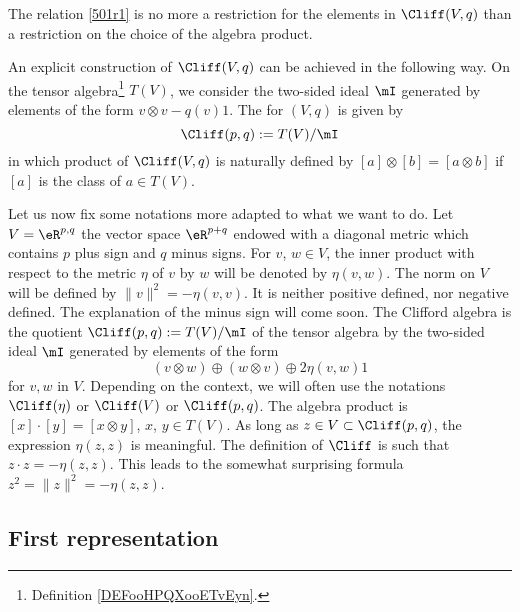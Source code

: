 \begin{remark}
	The relation \eqref{501r1} is no more a restriction for the elements in $\Cliff(V,q)$ than a restriction on the choice of the algebra product.
\end{remark}


An explicit construction of $\Cliff(V,q)$ can be achieved in the following way. On the tensor algebra\footnote{Definition \ref{DEFooHPQXooETvEyn}.} \( T(V)\), we consider the two-sided ideal $\mI$ generated by elements of the form $v\otimes v-q(v)1$. The   for $(V,q)$ is given by
\begin{equation}	\label{defI}
	\Cliff(p,q):=T(V)/\mI
\end{equation}
in which product of $\Cliff(V,q)$ is naturally defined by $[a]\otimes[b]=[a\otimes b]$ if $[a]$ is the class of $a\in T(V)$.

Let us now fix some notations more adapted to what we want to do. Let $V=\eR^{p,q}$ the vector space $\eR^{p+q}$ endowed with a diagonal metric which contains $p$ plus sign and $q$ minus signs. For $v$, $w\in V$, the inner product with respect to the metric $\eta$ of $v$ by $w$ will be denoted by $\eta(v,w)$.  The norm on $V$ will be defined by $\|v\|^2=-\eta(v,v)$. It is neither positive defined, nor negative defined. The explanation of the minus sign will come soon. The Clifford algebra is the quotient $\Cliff(p,q):=T(V)/\mI$ of the tensor algebra by the two-sided ideal $\mI$ generated by elements of the form
\[
	(v\otimes w)\oplus (w\otimes v)\oplus 2\eta(v,w)1
\]
for $v,w$ in $V$. Depending on the context, we will often use the notations $\Cliff(\eta)$ or $\Cliff(V)$ or $\Cliff(p,q)$. The algebra product is $[x]\cdot[y]=[x\otimes y]$, $x$, $y\in T(V)$.  As long as $z\in V\subset\Cliff(p,q)$, the expression $\eta(z,z)$ is meaningful. The definition of $\Cliff$ is such that $z\cdot z=-\eta(z,z)$. This leads to the somewhat surprising formula  $z^2=\|z\|^2=-\eta(z,z)$.

\subsection{First representation}

